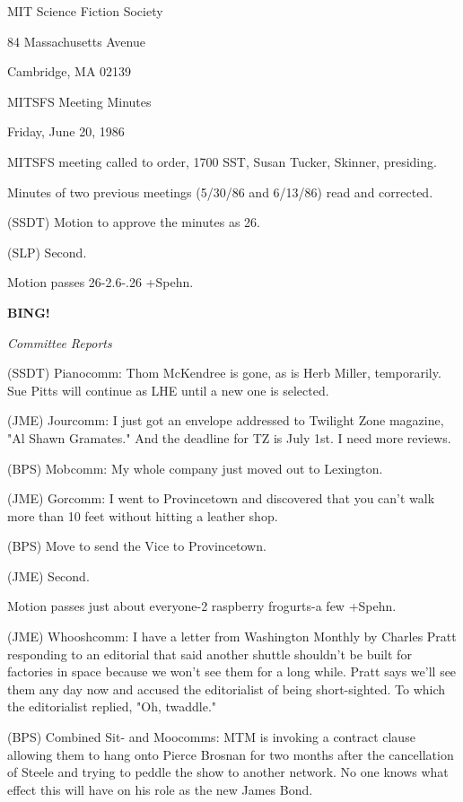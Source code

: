 \documentclass[12pt]{article}
\newcommand{\bing}{{\bf BING!} }
\newcommand{\goto}[1]{\bing \vskip 12pt \centerline{{\em{#1}}}}
\begin{document}
\begin{center}

MIT Science Fiction Society 

84 Massachusetts Avenue

Cambridge, MA 02139

\vspace{12pt}

MITSFS Meeting Minutes 

Friday, June 20, 1986

\end{center}
 
\vspace{18pt}

\setlength{\parskip}{6pt}

\noindent
MITSFS meeting called to order, 1700 SST,
Susan Tucker, Skinner, presiding.

Minutes of two previous meetings (5/30/86 and 6/13/86) read and corrected.

(SSDT) Motion to approve the minutes as 26.

(SLP) Second.

Motion passes 26-2.6-.26 +Spehn.

\goto{Committee Reports}

(SSDT) Pianocomm: Thom McKendree is gone, as is Herb Miller, temporarily. Sue Pitts will continue as LHE until a new one is selected.

(JME) Jourcomm: I just got an envelope addressed to Twilight Zone magazine, "Al Shawn Gramates." And the deadline for TZ is July 1st. I need more reviews.

(BPS) Mobcomm: My whole company just moved out to Lexington.

(JME) Gorcomm: I went to Provincetown and discovered that you can't walk more than 10 feet without hitting a leather shop.

(BPS) Move to send the Vice to Provincetown.

(JME) Second.

Motion passes just about everyone-2 raspberry frogurts-a few +Spehn.

(JME) Whooshcomm: I have a letter from Washington Monthly by Charles Pratt responding to an editorial that said another shuttle shouldn't be built for factories in space because we won't see them for a long while. Pratt says we'll see them any day now and accused the editorialist of being short-sighted. To which the editorialist replied, "Oh, twaddle."

(BPS) Combined Sit- and Moocomms: MTM is invoking a contract clause allowing them to hang onto Pierce Brosnan for two months after the cancellation of Steele and trying to peddle the show to another network. No one knows what effect this will have on his role as the new James Bond.
\end{document}
